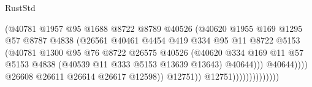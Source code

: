 \begin{lexlean}{RustStd}
\begin{coremodule}
                                            (@40781
                                              @1957
                                              @95
                                              @1688
                                              @8722
                                              @8789
                                              @40526
                                              (@40620
                                                @1955
                                                @169
                                                @1295
                                                @57
                                                @8787
                                                @4838
                                                (@26561
                                                  @40461
                                                  @4454
                                                  @419
                                                  @334
                                                  @95
                                                  @11
                                                  @8722
                                                  @5153
                                                  (@40781
                                                    @1300
                                                    @95
                                                    @76
                                                    @8722
                                                    @26575
                                                    @40526
                                                    (@40620
                                                      @334
                                                      @169
                                                      @11
                                                      @57
                                                      @5153
                                                      @4838
                                                      (@40539 @11 @333 @5153 @13639 @13643)
                                                      @40644)))
                                                @40644))))
                                        @26608
                                        @26611
                                        @26614
                                        @26617
                                        @12598))
                                    @12751))
                                @12751))))))))))))))

\end{coremodule}
\end{lexlean}
